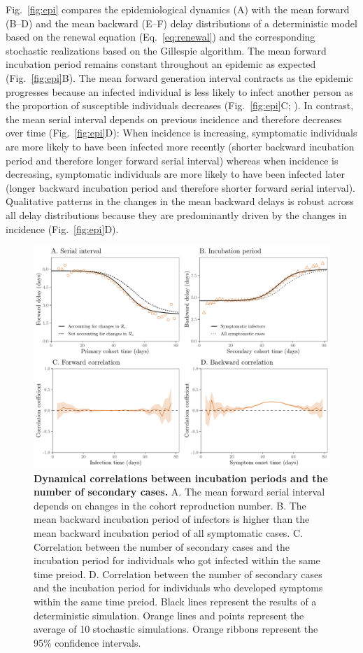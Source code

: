 \documentclass[12pt]{article}
\newcommand{\eref}[1]{Eq.~\ref{eq:#1}}
\newcommand{\fref}[1]{Fig.~\ref{fig:#1}}
\begin{document}
\fref{epi} compares the epidemiological dynamics (A) with the mean forward (B--D) and the mean backward (E--F) delay distributions of a deterministic model based on the renewal equation (\eref{renewal}) and the corresponding stochastic realizations based on the Gillespie algorithm.
The mean forward incubation period remains constant throughout an epidemic as expected (\fref{epi}B).
The mean forward generation interval contracts as the epidemic progresses because an infected individual is less likely to infect another person as the proportion of susceptible individuals decreases (\fref{epi}C; \cite{champredon2015intrinsic}).
In contrast, the mean serial interval depends on previous incidence and therefore decreases over time (\fref{epi}D):
When incidence is increasing, symptomatic individuals are more likely to have been infected more recently (shorter backward incubation period and therefore longer forward serial interval) whereas when incidence is decreasing, symptomatic individuals are more likely to have been infected later (longer backward incubation period and therefore shorter forward serial interval).
Qualitative patterns in the changes in the mean backward delays is robust across all delay distributions because they are predominantly driven by the changes in incidence (\fref{epi}D).

\begin{figure}[!th]
\includegraphics[width=\textwidth]{forward_tease.pdf}
\caption{
\textbf{Dynamical correlations between incubation periods and the number of secondary cases.}
A. The mean forward serial interval depends on changes in the cohort reproduction number.
B. The mean backward incubation period of infectors is higher than the mean backward incubation period of all symptomatic cases.
C. Correlation between the number of secondary cases and the incubation period for individuals who got infected within the same time preiod.
D. Correlation between the number of secondary cases and the incubation period for individuals who developed symptoms within the same time preiod.
Black lines represent the results of a deterministic simulation.
Orange lines and points represent the average of 10 stochastic simulations.
Orange ribbons represent the 95\% confidence intervals.
}
\label{fig:tease}
\end{figure}
\end{document}
